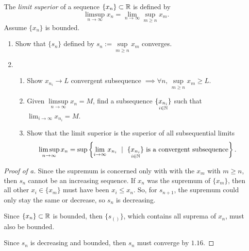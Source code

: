 \documentclass[../quiz3]{subfiles}
\begin{document}
\begin{problem}[3]
The \textit{limit superior} of a sequence $\{x_n\} \subset \mathbb{R}$ is defined by \[
	\limsup_{n \to \infty} x_n=\lim_{n \to \infty} \sup\limits_{m\ge n}x_m
	.\]
Assume $\{x_n\}$ is bounded.
\begin{enumerate}[label=(\alph*)]
	\item Show that $\{s_n\}$ defined by $s_n:=\sup\limits_{m\ge n} x_m$ converges.
	\item
	      \begin{enumerate}[label=(\roman*)]
		      \item Show $x_{n_i}\to L$ convergent subsequence $\implies \forall n,\, \sup\limits_{m\ge n}x_m\ge L$.

		      \item Given $\limsup\limits_{n \to \infty} x_n=M$, find a subsequence $\underset{i\in \mathbb{N}}{\{x_{n_i}\}}$ such that $\lim_{i \to \infty} x_{n_i}=M$.
		      \item Show that the limit superior is the superior of all subsequential limits \[
			            \limsup_{n \to \infty} x_n=\sup \left\{\lim_{i \to \infty} x_{n_i}\ \mid\ \underset{i\in \N}{\left\{x_{n_i}\right\} } \text{ is a convergent subsequence}\right\}
			            .\]
	      \end{enumerate}
\end{enumerate}
\end{problem}
\begin{proof}[Proof of a]
	Since the supremum is concerned only with with the $x_m$ with $m\ge n$, then $s_n$ cannot be an increasing sequence. If $x_n$ was the supremum of  $\{x_m\} $, then all other $x_i\in \{x_m\} $ must have been $x_i\le x_n$. So, for $s_{n+1}$, the supremum could only stay the same or decrease, so $s_n$ is decreasing.

	Since  $\{x_n\}\subset \mathbb{R} $ is bounded, then $\{s_()\} $, which contains all suprema of $x_n$, must also be bounded.

	Since $s_n$ is decreasing and bounded, then $s_n$ must converge by  $1.16$.
\end{proof}
\end{document}
